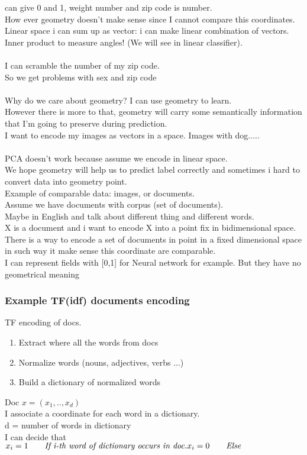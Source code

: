 can give 0 and 1, weight number and zip code is number.\\
How ever geometry doesn’t make sense since I cannot compare this
coordinates.\\
Linear space i can sum up as vector: i can make linear combination of
vectors.\\
Inner product to measure angles! (We will see in linear classifier).\\\\
I can scramble the number of my zip code.\\
So we get problems with sex and zip code\\\\
Why do we care about geometry? I can use geometry to learn.\\
However there is more to that, geometry will carry some semantically
information that I’m going to preserve during prediction.\\
I want to encode my images as vectors in a space. Images with dog.....\\\\
PCA doesn’t work because assume we encode in linear space.\\
We hope geometry will help us to predict label correctly and sometimes i hard
to convert data into geometry point.\\
Example of comparable data: images, or documents. \\
Assume we have documents with corpus (set of documents).\\
Maybe in English and talk about different thing and different words.\\
X is a document and i want to encode X into a point fix in bidimensional
space.\\
There is a way to encode a set of documents in point in a fixed dimensional
space in such way it make sense this coordinate are comparable.\\
I can represent fields with [0,1] for Neural network for example. But they have no geometrical meaning\\

\subsubsection{Example TF(idf) documents encoding} 
TF encoding of docs.
\begin{enumerate}
\item Extract where all the words from docs
\item Normalize words (nouns, adjectives, verbs ...)
\item Build a dictionary of normalized words
\end{enumerate}
Doc $x = (x_1, .., x_d) $\\
I associate a coordinate for each word in a dictionary.\\
d = number of words in dictionary\\
I can decide that \\
$x_i = 1 \qquad \textit{If i-th word of dictionary occurs in doc.}\\
 x_i = 0 \qquad \textit{Else} 
$\\

